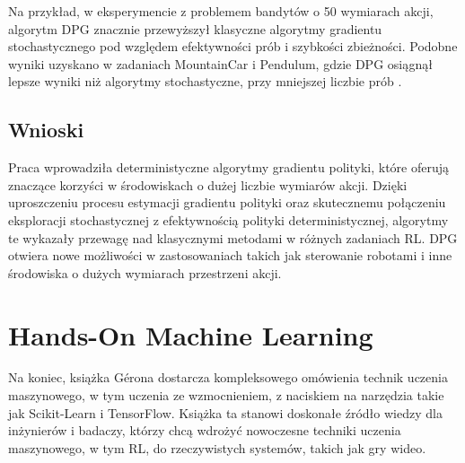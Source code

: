 Na przykład, w eksperymencie z problemem bandytów o 50 wymiarach akcji, algorytm DPG znacznie przewyższył klasyczne algorytmy gradientu stochastycznego pod względem efektywności prób i szybkości zbieżności. Podobne wyniki uzyskano w zadaniach MountainCar i Pendulum, gdzie DPG osiągnął lepsze wyniki niż algorytmy stochastyczne, przy mniejszej liczbie prób \cite{GRAD}.

\subsection{Wnioski}
Praca \cite{GRAD} wprowadziła deterministyczne algorytmy gradientu polityki, które oferują znaczące korzyści w środowiskach o dużej liczbie wymiarów akcji. Dzięki uproszczeniu procesu estymacji gradientu polityki oraz skutecznemu połączeniu eksploracji stochastycznej z efektywnością polityki deterministycznej, algorytmy te wykazały przewagę nad klasycznymi metodami w różnych zadaniach RL. DPG otwiera nowe możliwości w zastosowaniach takich jak sterowanie robotami i inne środowiska o dużych wymiarach przestrzeni akcji.

\section{Hands-On Machine Learning}
Na koniec, książka Gérona \cite{HML} dostarcza kompleksowego omówienia technik uczenia maszynowego, w tym uczenia ze wzmocnieniem, z naciskiem na narzędzia takie jak Scikit-Learn i TensorFlow. Książka ta stanowi doskonałe źródło wiedzy dla inżynierów i badaczy, którzy chcą wdrożyć nowoczesne techniki uczenia maszynowego, w tym RL, do rzeczywistych systemów, takich jak gry wideo.

